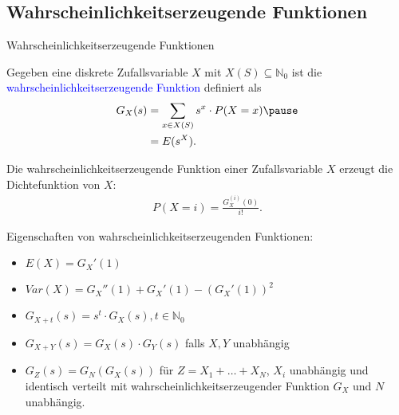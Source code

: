 \documentclass{beamer}
\def\padding{\vspace{0.5cm}}
\def\b{\textcolor{blue}}
\begin{document}
\subsection{Wahrscheinlichkeitserzeugende Funktionen}
\begin{frame}{Wahrscheinlichkeitserzeugende Funktionen}
    \begin{definition}
        Gegeben eine diskrete Zufallsvariable $X$ mit $X(S) \subseteq \mathbb{N}_0$ ist die \b{wahrscheinlichkeitserzeugende Funktion} definiert als
        \begin{align*}
            G_X(s) &= \sum_{x \in X(S)} s^x \cdot P(X=x)\pause \\
                   &= E(s^X).
        \end{align*}
    \end{definition}\pause\par\padding
    Die wahrscheinlichkeitserzeugende Funktion einer Zufallsvariable $X$ erzeugt die Dichtefunktion von $X$:
    \begin{align*}
        P(X = i) = \frac{G_X^{(i)}(0)}{i!}.
    \end{align*}
\end{frame}

\begin{frame}
    Eigenschaften von wahrscheinlichkeitserzeugenden Funktionen:\pause
    \begin{itemize}
        \item $E(X) = G_X'(1)$\pause
        \item $Var(X) = G_X''(1) + G_X'(1) - (G_X'(1))^2$\pause
        \item $G_{X + t}(s) = s^t \cdot G_X(s), t \in \mathbb{N}_0$\pause
        \item $G_{X + Y}(s) = G_X(s) \cdot G_Y(s)$ falls $X,Y$ unabhängig\pause
        \item $G_Z(s) = G_N(G_X(s))$ für $Z = X_1 + \dots + X_N$, $X_i$ unabhängig und identisch verteilt mit wahrscheinlichkeitserzeugender Funktion $G_X$ und $N$ unabhängig.
    \end{itemize}
\end{frame}
\end{document}
